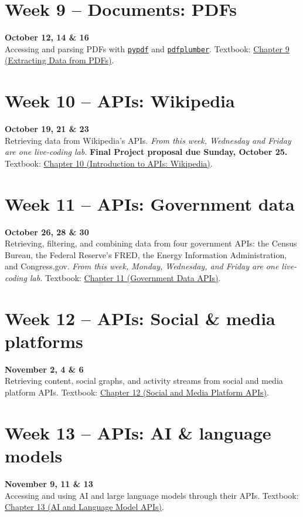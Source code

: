 \documentclass[11pt]{memoir}
\def\bookurl{https://cuinfoscience.github.io/Web-Data-Science-Book/}
\newcommand{\bookch}[2]{\href{\bookurl#1.html}{#2}}
\begin{document}
\section{Week 9 -- Documents: PDFs}
\textcolor{CUGold}{\textbf{October 12, 14 \& 16}}\\
Accessing and parsing PDFs with \href{https://pypdf.readthedocs.io/}{\texttt{pypdf}} and \href{https://github.com/jsvine/pdfplumber}{\texttt{pdfplumber}}. Textbook: \bookch{ch-09-pdfs}{Chapter 9 (Extracting Data from PDFs)}.

\section{Week 10 -- APIs: Wikipedia}
\textcolor{CUGold}{\textbf{October 19, 21 \& 23}}\\
Retrieving data from Wikipedia's APIs. \textit{From this week, Wednesday and Friday are one live-coding lab.} \textbf{Final Project proposal due Sunday, October 25.} Textbook: \bookch{ch-10-wikipedia}{Chapter 10 (Introduction to APIs: Wikipedia)}.

\section{Week 11 -- APIs: Government data}
\textcolor{CUGold}{\textbf{October 26, 28 \& 30}}\\
Retrieving, filtering, and combining data from four government APIs: the Census Bureau, the Federal Reserve's FRED, the Energy Information Administration, and Congress.gov. \textit{From this week, Monday, Wednesday, and Friday are one live-coding lab.} Textbook: \bookch{ch-11-government}{Chapter 11 (Government Data APIs)}.

\section{Week 12 -- APIs: Social \& media platforms}
\textcolor{CUGold}{\textbf{November 2, 4 \& 6}}\\
Retrieving content, social graphs, and activity streams from social and media platform APIs. Textbook: \bookch{ch-12-social}{Chapter 12 (Social and Media Platform APIs)}.

\section{Week 13 -- APIs: AI \& language models}
\textcolor{CUGold}{\textbf{November 9, 11 \& 13}}\\
Accessing and using AI and large language models through their APIs. Textbook: \bookch{ch-13-ai-apis}{Chapter 13 (AI and Language Model APIs)}.
\end{document}
